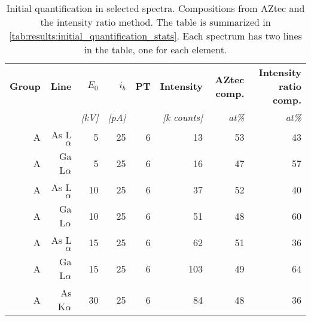 
\begin{table}[phtb]
    \begin{center}
        \caption{
            Initial quantification in selected spectra.
            Compositions from AZtec and the intensity ratio method.
            The table is summarized in \cref{tab:results:initial_quantification_stats}.
            Each spectrum has two lines in the table, one for each element.
        }
        \label{tab:results:initial_quantification}
        \begin{tabular}{rrrrrrrr}
            \hline
            \textbf{ Group} & \textbf{Line} & \textbf{$E_0$} & \textbf{$i_b$} & \textbf{PT} & \textbf{Intensity} & \textbf{AZtec comp.} & \textbf{Intensity ratio comp.} \\
            \emph{}         & \emph{}       & \emph{[kV]}    & \emph{[pA]}    & \emph{}     & \emph{[k counts]}  & \emph{at\%}          & \emph{at\%}                    \\
            \hline
            A               & As L$\alpha$  & 5              & 25             & 6           & 13                 & 53                   & 43                             \\
            A               & Ga L$\alpha$  & 5              & 25             & 6           & 16                 & 47                   & 57                             \\
            A               & As L$\alpha$  & 10             & 25             & 6           & 37                 & 52                   & 40                             \\
            A               & Ga L$\alpha$  & 10             & 25             & 6           & 51                 & 48                   & 60                             \\
            A               & As L$\alpha$  & 15             & 25             & 6           & 62                 & 51                   & 36                             \\
            A               & Ga L$\alpha$  & 15             & 25             & 6           & 103                & 49                   & 64                             \\
            A               & As K$\alpha$  & 30             & 25             & 6           & 84                 & 48                   & 36                             \\

\end{tabular}
\end{center}
\end{table}
